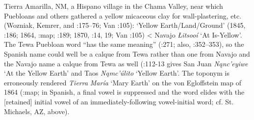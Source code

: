 Tierra Amarilla, NM, a Hispano village in the Chama Valley, near which Puebloans and others gathered a yellow micaceous clay for wall-plastering, etc. (Wozniak, Kemrer, and \citealt{Carillo1992}:175–76; Van \citealt{Valkenburgh1999}:105):  ‘Yellow Earth/Land/Ground’ (1845, \citealt{Correll1979}:186; 1864, \citealt{Kelley1970}:map; \citealt{Bailey1964b}:189; 1870, \citealt{Murphy1967}:14, 19; Van \citealt{Valkenburgh1999}:105) < Navajo \textit{Łitsooí}  ‘At Is-Yellow’.  The Tewa Puebloan word “has the same meaning” (\citealt{Linford2000}:271; also, \citealt{Julyan1998}:352–353), so the Spanish name could well be a calque from Tewa rather than one from Navajo and the Navajo name a calque from Tewa as well (\citealt{Harrington1916}:112-13 gives San Juan \textit{Nąnc’eyiwe} ‘At the Yellow Earth’ and Taos \textit{Nąmc’úlito} ‘Yellow Earth’.  The toponym is erroneously rendered \textit{Tierra} \textit{María} ‘Mary Earth’ on the von Egloffstein map of 1864 (\citealt{Madsen2010}:map; in Spanish, a final vowel is suppressed and the word elides with the [retained] initial vowel of an immediately-following vowel-initial word; cf. St. Michaels, AZ, above).

